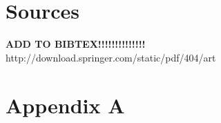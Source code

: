 \documentclass[11pt]{article}
\begin{document}
\cite{Aad2014}

\pagebreak

\section{Sources}

\begin{flushleft}
\textbf{ADD TO BIBTEX!!!!!!!!!!!!!!}
http://download.springer.com/static/pdf/404/art%
\end{flushleft}

\cite{Aad2014}



\section*{Appendix A}
\end{document}
